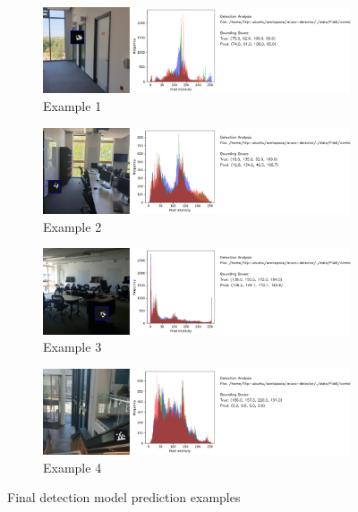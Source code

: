 \documentclass[conference]{IEEEtran}
\begin{document}
\begin{figure}[h]
  \centering
  \begin{subfigure}[b]{0.45\textwidth}
    \centering
    \includegraphics[width=\textwidth]{images/result_vis_1.png}
    \caption{Example 1}
    \label{fig:det_res_ex1}
  \end{subfigure}
  \hfill
  \begin{subfigure}[b]{0.45\textwidth}
    \centering
    \includegraphics[width=\textwidth]{images/result_vis_2.png}
    \caption{Example 2}
    \label{fig:det_res_ex2}
  \end{subfigure}    
  \vspace{0.5cm}
  \begin{subfigure}[b]{0.45\textwidth}
    \centering
    \includegraphics[width=\textwidth]{images/result_vis_4.png}
    \caption{Example 3}
    \label{fig:det_res_ex3}
  \end{subfigure}
  \hfill
  \begin{subfigure}[b]{0.45\textwidth}
      \centering
      \includegraphics[width=\textwidth]{images/result_vis_5.png}
      \caption{Example 4}
      \label{fig:det_res_ex4}
  \end{subfigure}
  \caption{Final detection model prediction examples}
  \label{fig:final_detection_examples}
\end{figure}
\end{document}
